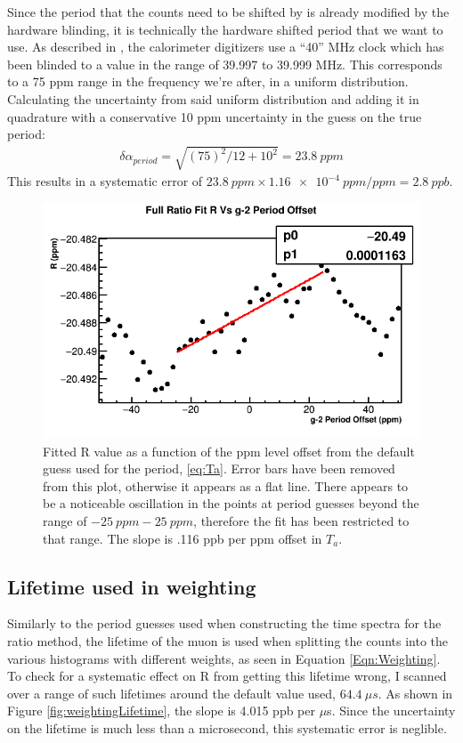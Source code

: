 		Since the period that the counts need to be shifted by is already modified by the hardware blinding, it is technically the hardware shifted \gmtwo period that we want to use. As described in \cite{ClockManual}, the calorimeter digitizers use a ``40'' MHz clock which has been blinded to a value in the range of 39.997 to 39.999 MHz. This corresponds to a 75 ppm range in the frequency we're after, in a uniform distribution. Calculating the uncertainty from said uniform distribution and adding it in quadrature with a conservative 10 ppm uncertainty in the guess on the true \gmtwo period: 
			\begin{align}
				\delta\alpha_{period} = \sqrt{(75)^{2}/12 + 10^{2}} = \SI{23.8}{ppm}
			\end{align}
		This results in a systematic error of $\SI{23.8}{ppm} \times \SI{1.16e-4}{ppm/ppm} = \SI{2.8}{ppb}$.

		\begin{figure}[]
			\centering
			\includegraphics[width=.6\textwidth]{RatioCBO_R_Vs_gm2PeriodGuess_Canv}
		    \caption[gm2PeriodGuess]{Fitted R value as a function of the ppm level offset from the default guess used for the \gmtwo period, \ref{eq:Ta}. Error bars have been removed from this plot, otherwise it appears as a flat line. There appears to be a noticeable oscillation in the points at \gmtwo period guesses beyond the range of $\SI{-25}{ppm} - \SI{+25}{ppm}$, therefore the fit has been restricted to that range. The slope is .116 ppb per ppm offset in $T_{a}$.}
		    \label{fig:gm2PeriodGuess}
		\end{figure}

	\subsection{Lifetime used in weighting}
	\label{SubSec:LifetimeWeighting}

		Similarly to the \gmtwo period guesses used when constructing the time spectra for the ratio method, the lifetime of the muon is used when splitting the counts into the various histograms with different weights, as seen in Equation \ref{Eqn:Weighting}. To check for a systematic effect on R from getting this lifetime wrong, I scanned over a range of such lifetimes around the default value used, $\SI{64.4}{\mu s}$. As shown in Figure \ref{fig:weightingLifetime}, the slope is 4.015 ppb per $\mu$s. Since the uncertainty on the lifetime is much less than a microsecond, this systematic error is neglible.

